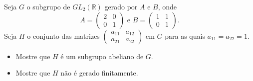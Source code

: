 Seja \(G\) o subgrupo de \(GL_{2}(\mathbb{R})\) gerado por \(A\) e \(B\), onde
\[A=\begin{pmatrix} 2 &0\\ 0&1 \end{pmatrix} \text{ e } B=\begin{pmatrix} 1 &1\\ 0&1 \end{pmatrix}.\]
Seja \(H\) o conjunto das matrizes \(\begin{pmatrix} a_{11} &a_{12}\\ a_{21}& a_{22} \end{pmatrix}\) em \(G\) para as quais \(a_{11}=a_{22}=1\).
\begin{itemize}
    \item[(a)] Mostre que \(H\) é um subgrupo abeliano de \(G\).
    \item[(b)] Mostre que \(H\) não é gerado finitamente.
\end{itemize}
